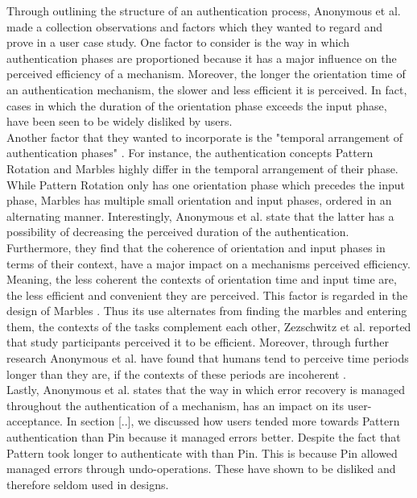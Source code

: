 Through outlining the structure of an authentication process, Anonymous et al. \cite{anonymous} made a collection observations and factors which they wanted to regard and prove in a user case study. One factor to consider is the way in which authentication phases are proportioned because it has a major influence on the perceived efficiency of a mechanism. Moreover, the longer the orientation time of an authentication mechanism, the slower and less efficient it is perceived. In fact, cases in which the duration of the orientation phase exceeds the input phase, have been seen to be widely disliked by users. \\

Another factor that they wanted to incorporate is the "temporal arrangement of authentication phases" \cite{anonymous}. For instance, the authentication concepts Pattern Rotation \cite{Marbles} and Marbles highly differ in the temporal arrangement of their phase. While Pattern Rotation only has one orientation phase which precedes the input phase, Marbles has multiple small orientation and input phases, ordered in an alternating manner. Interestingly, Anonymous et al. \cite{anonymous} state that the latter has a possibility of decreasing the perceived duration of the authentication. Furthermore, they find that the coherence of orientation and input phases in terms of their context, have a major impact on a mechanisms perceived efficiency. Meaning, the less coherent the contexts of orientation time and input time are, the less efficient and convenient they are perceived. This factor is regarded in the design of Marbles \cite{Marbles}. Thus its use alternates from finding the marbles and entering them, the contexts of the tasks complement each other, Zezschwitz et al. \cite{Marbles} reported that study participants perceived it to be efficient. Moreover, through further research Anonymous et al. \cite{anonymous} have found that humans tend to perceive time periods longer than they are, if the contexts of these periods are incoherent \cite{anonymous,perception}.\\

Lastly, Anonymous et al. \cite{anonymous} states that the way in which error recovery is managed throughout the authentication of a mechanism, has an impact on its user-acceptance. In section [..], we discussed how users tended more towards Pattern authentication than Pin because it managed errors better. Despite the fact that Pattern took longer to authenticate with than Pin. This is because Pin allowed managed errors through undo-operations. These have shown to be disliked and therefore seldom used in designs. 


